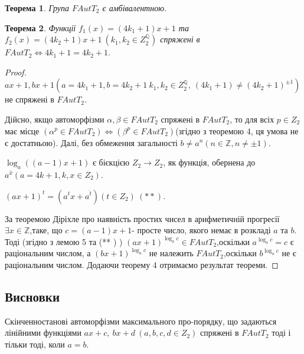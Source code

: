 \documentclass[a4paper,12pt]{article} \usepackage{a4wide}
\numberwithin{equation}{subsection}
\newtheorem{theorem}{Теорема}[subsection]
\begin{document}
\begin{theorem}
Група $FAutT_2$ є амбівалентною.
\end{theorem}
\begin{theorem}
Функції $f_1(x)=(4k_1+1)x+1$ та $f_2(x)=(4k_2+1)x+1 \ (k_1,k_2 \in
Z_2^{\mathbb{Q}})$ спряжені в $FAutT_2 \Leftrightarrow
4k_1+1=4k_2+1.$
\end{theorem}
\begin{proof}


  $ax+1,bx+1 (a=4k_1+1,b=4k_2+1\ k_1,k_2\in Z_2^{\mathbb{Q}}, \ (4k_1+1)\neq (4k_2+1)^{\pm 1})$ не
спряжені в $FAutT_2$.

  Дійсно, якщо автоморфізми $\alpha,\beta \in
FAutT_2$ спряжені в $FAutT_2$, то для всіх $p\in Z_2$ має місце
$(\alpha^p\in FAutT_2)\Leftrightarrow(\beta^p\in FAutT_2)$(згідно
з теоремою 4, ця умова не є достатньою). Далі, без обмеження
загальності $b\neq a^n ( n\in \mathbb{Z},n\neq \pm 1)$.

$\log_a((a-1)x+1)$ є бієкцією $Z_2\rightarrow Z_2$, як функція,
обернена до $a^{\widehat{x}}(a=4k+1,k,x\in Z_2)$.\

${(ax+1)}^t={(a^tx+a^{\widehat{t}})}(t\in Z_2)\ (** )$.

 За
теоремою Діріхле про наявність простих чисел в арифметичній
прогресії $\exists x\in \mathbb{Z} $,таке, що $c=(a-1)x+1$- просте
число, якого немає в розкладі $a$ та $b$. Тоді (згідно з лемою 5
та (** ) ) $(ax+1)^{\log_ac}\in FAutT_2$,оскільки $a^{\log_ac}=c$
є раціональним числом, а $(bx+1)^{\log_ac}$ не належить
$FAutT_2$,оскільки $b^{\log_ac}$ не є раціональним числом. Додаючи
теорему 4 отримаємо результат теореми.
\end{proof}


\subsection*{Висновки}




 Скінченностанові автоморфізми максимального про-порядку, що задаються лінійними
 функціями $ax+c,\ bx+d\ (a,b,c,d\in Z_2)$ спряжені в $FAutT_2$ тоді і тільки тоді, коли
  $a=b$.
\end{document}
